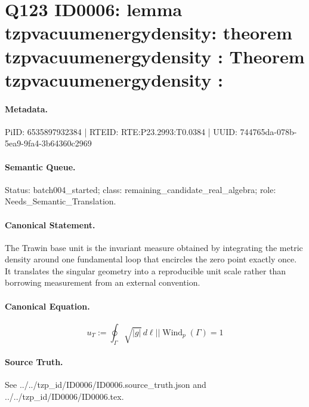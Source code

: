 \section*{Q123 ID0006: lemma tzpvacuumenergydensity: theorem tzpvacuumenergydensity : Theorem tzpvacuumenergydensity :}
\paragraph{Metadata.}
PiID: 6535897932384 | RTEID: RTE:P23.2993:T0.0384 | UUID: 744765da-078b-5ea9-9fa4-3b64360c2969

\paragraph{Semantic Queue.}
Status: batch004\_started; class: remaining\_candidate\_real\_algebra; role: Needs\_Semantic\_Translation.

\paragraph{Canonical Statement.}
The Trawin base unit is the invariant measure obtained by integrating the metric density around one fundamental loop that encircles the zero point exactly once. It translates the singular geometry into a reproducible unit scale rather than borrowing measurement from an external convention.

\paragraph{Canonical Equation.}
\[
u_{T} := \oint_{\Gamma} \sqrt{\lvert g \rvert}\, d\ell || \operatorname{Wind}_{p}(\Gamma)=1
\]

\paragraph{Source Truth.}
See ../../tzp\_id/ID0006/ID0006.source\_truth.json and ../../tzp\_id/ID0006/ID0006.tex.
